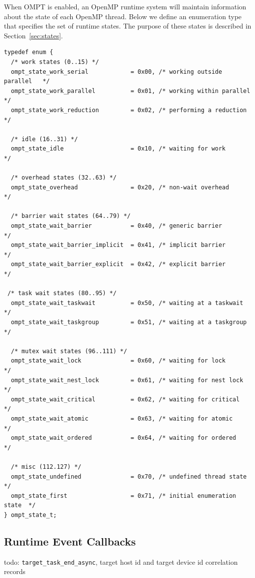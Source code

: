 \documentclass{article}
\begin{document}
{When OMPT is enabled, an OpenMP runtime system will maintain information about the state of  each OpenMP thread. 
Below we define an enumeration type that specifies the set of runtime states. 
The purpose of these states is described in Section~\ref{sec:states}.

\begin{verbatim}
typedef enum {
  /* work states (0..15) */
  ompt_state_work_serial            = 0x00, /* working outside parallel   */
  ompt_state_work_parallel          = 0x01, /* working within parallel    */
  ompt_state_work_reduction         = 0x02, /* performing a reduction     */

  /* idle (16..31) */
  ompt_state_idle                   = 0x10, /* waiting for work           */

  /* overhead states (32..63) */
  ompt_state_overhead               = 0x20, /* non-wait overhead          */

  /* barrier wait states (64..79) */
  ompt_state_wait_barrier           = 0x40, /* generic barrier            */
  ompt_state_wait_barrier_implicit  = 0x41, /* implicit barrier           */
  ompt_state_wait_barrier_explicit  = 0x42, /* explicit barrier           */
    
 /* task wait states (80..95) */
  ompt_state_wait_taskwait          = 0x50, /* waiting at a taskwait      */
  ompt_state_wait_taskgroup         = 0x51, /* waiting at a taskgroup     */
	
  /* mutex wait states (96..111) */	      	    
  ompt_state_wait_lock              = 0x60, /* waiting for lock           */
  ompt_state_wait_nest_lock         = 0x61, /* waiting for nest lock      */
  ompt_state_wait_critical          = 0x62, /* waiting for critical       */
  ompt_state_wait_atomic            = 0x63, /* waiting for atomic         */
  ompt_state_wait_ordered           = 0x64, /* waiting for ordered        */

  /* misc (112.127) */
  ompt_state_undefined              = 0x70, /* undefined thread state     */
  ompt_state_first                  = 0x71, /* initial enumeration state  */
} ompt_state_t;
\end{verbatim}
\clearpage
\subsection{Runtime Event Callbacks}
\label{appendix:ompt-types:events}

{\color{red} todo: \verb|target_task_end_async|, target host id and target device id correlation records}

}
\end{document}
